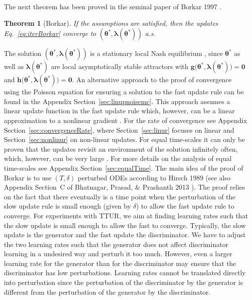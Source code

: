 \documentclass{article}
\newtheorem{theorem}{Theorem}
\newcommand\Bg{\bm{g}}
\newcommand\Bh{\bm{h}}
\newcommand\Bla{\bm{\lambda}}
\newcommand\Bth{\bm{\theta}}
\newcommand\BZe{\bm{0}}
\begin{document}
The next theorem has been proved in the seminal paper of Borkar 1997 \cite{Borkar:97}.
\begin{theorem}[Borkar]
\label{th:borkar}
If the assumptions are satisfied,
then the updates Eq.~\eqref{eq:iterBorkar}
converge to $(\Bth^{*}, \Bla(\Bth^{*}))$ a.s.
\end{theorem}
The solution $(\Bth^{*}, \Bla(\Bth^{*}))$ is a
stationary local Nash equilibrium \cite{Prasad:15}, since
$\Bth^{*}$ as well
as $\Bla(\Bth^{*})$ are local asymptotically stable
attractors with $\Bg\big(\Bth^{*}, \Bla(\Bth^{*})\big)=\BZe$ and
$\Bh\big(\Bth^{*},\Bla(\Bth^{*})\big)=\BZe$.
An alternative approach to the proof of convergence
using the Poisson equation for ensuring a
solution to the fast update rule can be found in the Appendix
Section~\ref{sec:linupnoisemc}.
This approach assumes a linear update function in the fast
update rule which, however,
can be a linear approximation to a nonlinear gradient \cite{Konda:02,Konda:03}.
For the rate of convergence see Appendix Section~\ref{sec:convergenceRate},
where Section~\ref{sec:linur} focuses on linear and
Section~\ref{sec:nonlinur} on non-linear updates.
For equal time-scales it can only be proven that
the updates revisit an environment of the solution infinitely often,
which, however, can be very large \cite{Zhang:07,DiCastro:10}.
For more details on the analysis of
equal time-scales see Appendix Section~\ref{sec:equalTime}.
The main idea of the proof of Borkar
\cite{Borkar:97} is to use
$(T,\delta)$ perturbed ODEs according to Hirsch 1989 \cite{Hirsch:89}
(see also Appendix Section~C of  Bhatnagar, Prasad, \& Prashanth 2013 \cite{Bhatnagar:13}).
The proof relies on the fact that
there eventually is a time point when the perturbation of the slow
update rule is
small enough (given by $\delta$) to allow the fast update rule to converge.
For experiments with TTUR, we aim at
finding learning rates such that the slow update is small enough
to allow the fast to converge.
Typically, the slow update is the generator and the fast update the
discriminator.
We have to adjust the two learning rates such that
the generator does not affect discriminator learning
in a undesired way and perturb it too much.
However, even a larger learning rate for the generator than for the
discriminator may ensure that the discriminator has low perturbations.
Learning rates cannot be translated directly into perturbation since
the perturbation of the discriminator by the generator is
different from the perturbation of the generator by the discriminator.
\end{document}
